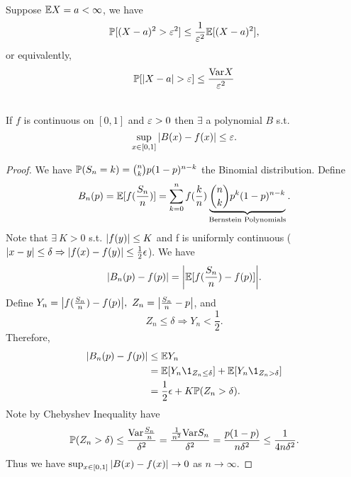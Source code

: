 \begin{proposition}\ \\
Suppose $\E X = a < \infty$, we have
\begin{equation*}
    \P[(X - a)^2 > \vep^2] \leq \frac{1}{\vep^2} \E[(X-a)^2],
\end{equation*}
or equivalently,
\begin{equation*}
    \P[\abs{X - a} > \vep] \leq \frac{\Var{X}}{\vep^2}
\end{equation*}
\end{proposition}


\vspace{6pt}
\begin{theorem}\ \\
If $f$ is continuous on $[0,1]$ and $\vep > 0$ then $\exists$ a polynomial $B$ s.t.
\begin{equation*}
    \sup_{x \in [0,1]} \abs{B(x) - f(x)} \leq \vep.
\end{equation*}
\end{theorem}
\begin{proof}
We have $\P(S_n = k) = \binom{n}{k}p (1 - p)^{n - k}$ the Binomial distribution. Define
\begin{equation*}
    B_n(p) = \E[f(\frac{S_n}{n})] = \sum_{k = 0}^n f(\frac{k}{n}) \underbrace{\binom{n}{k} p^k (1 - p)^{n - k}}_{\text{Bernstein Polynomials}}.
\end{equation*}
Note that $\exists\ K > 0$ s.t. $\abs{f(y)} \leq K$ and f is uniformly continuous ($\abs{x - y} \leq \delta \Rightarrow \abs{f(x) - f(y)} \leq \frac{1}{2} \ep$). We have
\begin{align*}
    \abs{B_n(p) - f(p)} = \abs{\E[f(\frac{S_n}{n}) - f(p)]}.
\end{align*}
Define $Y_n = \abs{f(\frac{S_n}{n}) - f(p)},\ Z_n = \abs{\frac{S_n}{n} - p}$, and
\begin{equation*}
    Z_n \leq \delta \Rightarrow Y_n < \frac{1}{2}.
\end{equation*}
Therefore,
\begin{align*}
    \abs{B_n(p) - f(p)} &\leq \E Y_n\\
    &= \E[Y_n \1_{Z_n \leq \delta}] + \E[Y_n \1_{Z_n > \delta}]\\
    &= \frac{1}{2} \ep + K \P(Z_n > \delta).
\end{align*}
Note by Chebyshev Inequality have
\begin{equation*}
    \P(Z_n > \delta) \leq \frac{\Var{\frac{S_n}{n}}}{\delta^2} = \frac{\frac{1}{n^2} \Var{S_n}}{\delta^2} = \frac{p(1 - p)}{n \delta^2} \leq \frac{1}{4n\delta^2}.
\end{equation*}
Thus we have $ \sup_{x \in [0,1]} \abs{B(x) - f(x)} \to 0$ as $n \to \infty$.
\end{proof}

